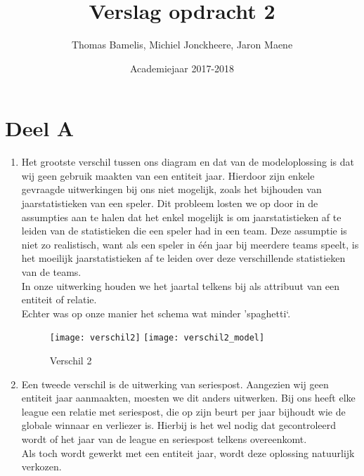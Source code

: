 \documentclass[a4paper,kulak]{kulakarticle}
\date{Academiejaar 2017-2018}
\title{Verslag opdracht 2}
\author{Thomas Bamelis, Michiel Jonckheere, Jaron Maene}
\begin{document}
\maketitle


\section{Deel A}
\begin{enumerate}
		\begin{figure}[!htb]
			\centering
			\texttt{[image: verschil1\_model]}
			\caption{Verschil 1}
			\label{fig:verschil1}
		\end{figure}
	\item Het grootste verschil tussen ons diagram en dat van de modeloplossing is dat wij geen gebruik maakten van een entiteit jaar. Hierdoor zijn enkele gevraagde uitwerkingen bij ons niet mogelijk, zoals het bijhouden van jaarstatistieken van een speler. Dit probleem losten we op door in de assumpties aan te halen dat het enkel mogelijk is om jaarstatistieken af te leiden van de statistieken die een speler had in een team. Deze assumptie is niet zo realistisch, want als een speler in één jaar bij meerdere teams speelt, is het moeilijk jaarstatistieken af te leiden over deze verschillende statistieken van de teams.\\
	In onze uitwerking houden we het jaartal telkens bij als attribuut van een entiteit of relatie. \\
	Echter was op onze manier het schema wat minder 'spaghetti`.
	
		\begin{figure}[!htb]
			\centering
			\texttt{[image: verschil2]}
			\texttt{[image: verschil2\_model]}
			\caption{Verschil 2}
			\label{fig:verschil2}
		\end{figure}
	\item Een tweede verschil is de uitwerking van seriespost. Aangezien wij geen entiteit jaar aanmaakten, moesten we dit anders uitwerken. Bij ons heeft elke league een relatie met seriespost, die op zijn beurt per jaar bijhoudt wie de globale winnaar en verliezer is. Hierbij is het wel nodig dat gecontroleerd wordt of het jaar van de league en seriespost telkens overeenkomt. \\
	Als toch wordt gewerkt met een entiteit jaar, wordt deze oplossing natuurlijk verkozen.
	

\end{enumerate}
\end{document}
